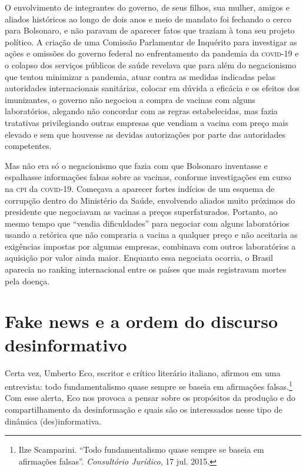 O envolvimento de integrantes do governo, de seus filhos, sua mulher,
amigos e aliados históricos ao longo de dois anos e meio de mandato foi
fechando o cerco para Bolsonaro, e não paravam de aparecer fatos que
traziam à tona seu projeto político. A criação de uma Comissão
Parlamentar de Inquérito para investigar as ações e omissões do governo
federal no enfrentamento da pandemia da \textsc{covid-19} e o colapso dos
serviços públicos de saúde revelava que para além do negacionismo que
tentou minimizar a pandemia, atuar contra as medidas indicadas pelas
autoridades internacionais sanitárias, colocar em dúvida a eficácia e os
efeitos dos imunizantes, o governo não negociou a compra de vacinas com
alguns laboratórios, alegando não concordar com as regras estabelecidas,
mas fazia tratativas privilegiando outras empresas que vendiam a vacina
com preço mais elevado e sem que houvesse as devidas autorizações por
parte das autoridades competentes.

Mas não era só o negacionismo que fazia com que Bolsonaro inventasse e
espalhasse informações falsas sobre as vacinas, conforme investigações
em curso na \textsc{cpi} da \textsc{covid-19}. Começava a aparecer fortes indícios de
um esquema de corrupção dentro do Ministério da Saúde, envolvendo aliados
muito próximos do presidente que negociavam as vacinas a preços
superfaturados. Portanto, ao mesmo tempo que ``vendia dificuldades''
para negociar com alguns laboratórios usando a retórica que não
compraria a vacina a qualquer preço e não aceitaria as exigências
impostas por algumas empresas, combinava com outros laboratórios a
aquisição por valor ainda maior. Enquanto essa negociata ocorria, o
Brasil aparecia no ranking internacional entre os países que mais
registravam mortes pela doença.

\chapter[Fake news e a ordem do discurso desinformativo]{Fake news e a ordem do discurso\\desinformativo}


Certa vez, Umberto Eco, escritor e crítico literário italiano, afirmou
em uma entrevista: todo fundamentalismo quase sempre se baseia em
afirmações falsas.\footnote{Ilze Scamparini. ``Todo fundamentalismo quase sempre se baseia em afirmações falsas''. \textit{Consultório Jurídico}, 17 jul. 2015.} Com esse alerta, Eco nos provoca a
pensar sobre os propósitos da produção e do compartilhamento da
desinformação e quais são os interessados nesse tipo de dinâmica (des)informativa.

